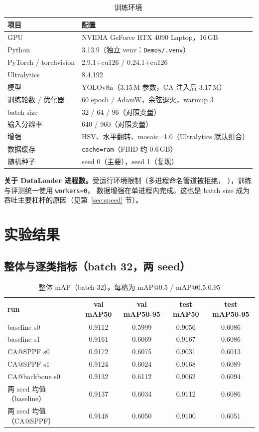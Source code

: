 \documentclass[UTF8,a4paper,11pt]{ctexart}
\begin{document}
\begin{table}[htbp]
\centering
\caption{训练环境}
\begin{tabular}{ll}
\toprule
项目 & 配置 \\
\midrule
GPU & NVIDIA GeForce RTX 4090 Laptop，16\,GB \\
Python & 3.13.9（独立 venv：\texttt{Demos/.venv}） \\
PyTorch / torchvision & 2.9.1+cu126 / 0.24.1+cu126 \\
Ultralytics & 8.4.192 \\
模型 & YOLOv8n（3.15\,M 参数，CA 注入后 3.17\,M） \\
训练轮数 / 优化器 & 60 epoch / AdamW，余弦退火，warmup 3 \\
batch size & 32 / 64 / 96（对照变量） \\
输入分辨率 & 640 / 960（对照变量） \\
增强 & HSV、水平翻转、mosaic=1.0（Ultralytics 默认组合） \\
数据缓存 & \texttt{cache=ram}（FBID 约 0.6\,GB） \\
随机种子 & seed 0（主要），seed 1（复现） \\
\bottomrule
\end{tabular}
\end{table}

\noindent\textbf{关于 DataLoader 进程数。}受运行环境限制（多进程命名管道被拒绝，
），训练与评测统一使用 \texttt{workers=0}，
数据增强在单进程内完成。这也是 batch size 成为吞吐主要杠杆的原因（见第~\ref{sec:speed} 节）。

\section{实验结果}

\subsection{整体与逐类指标（batch 32，两 seed）}

\begin{table}[htbp]
\centering
\caption{整体 mAP（batch 32）。每格为 mAP@0.5 / mAP@0.5:0.95}
\label{tab:overall}
\begin{tabular}{lcccc}
\toprule
run & val mAP50 & val mAP50-95 & test mAP50 & test mAP50-95 \\
\midrule
baseline s0      & 0.9112 & 0.5999 & 0.9056 & 0.6086 \\
baseline s1      & 0.9161 & 0.6069 & 0.9167 & 0.6086 \\
CA@SPPF s0       & 0.9172 & 0.6075 & 0.9031 & 0.6013 \\
CA@SPPF s1       & 0.9124 & 0.6024 & 0.9168 & 0.6089 \\
CA@backbone s0   & 0.9132 & 0.6112 & 0.9062 & 0.6094 \\
\midrule
两 seed 均值（baseline） & 0.9137 & 0.6034 & 0.9112 & 0.6086 \\
两 seed 均值（CA@SPPF）  & 0.9148 & 0.6050 & 0.9100 & 0.6051 \\
\bottomrule
\end{tabular}
\end{table}
\end{document}
